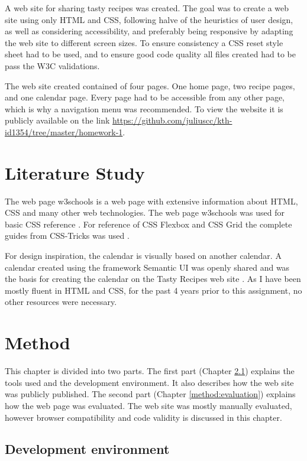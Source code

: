 \documentclass[a4paper]{scrartcl}
\begin{document}
A web site for sharing tasty recipes was created. The goal was to create a web site using only HTML and CSS, following halve of the heuristics of user design, as well as considering accessibility, and preferably being responsive by adapting the web site to different screen sizes. To ensure consistency a CSS reset style sheet had to be used, and to ensure good code quality all files created had to be pass the W3C validations.

The web site created contained of four pages. One home page, two recipe pages, and one calendar page. Every page had to be accessible from any other page, which is why a navigation menu was recommended. To view the website it is publicly available on the link \href{https://github.com/juliuscc/kth-id1354/tree/master/homework-1}{https://github.com/juliuscc/kth-id1354/tree/master/homework-1}.

\section{Literature Study}

The web page w3schools is a web page with extensive information about HTML, CSS and many other web technologies. The web page w3schools was used for basic CSS reference \cite{RefsnesData}. For reference of CSS Flexbox and CSS Grid the complete guides from CSS-Tricks was used \cite{Coyier,Coyiera}. 

For design inspiration, the calendar is visually based on another calendar. A calendar created using the framework Semantic UI was openly shared and was the basis for creating the calendar on the Tasty Recipes web site \cite{Nijin39} . As I have been mostly fluent in HTML and CSS, for the past 4 years prior to this assignment, no other resources were necessary.

\section{Method}
This chapter is divided into two parts. The first part (Chapter \ref{method:development}) explains the tools used and the development environment. It also describes how the web site was publicly published. The second part (Chapter \ref{method:evaluation}) explains how the web page was evaluated. The web site was mostly manually evaluated, however browser compatibility and code validity is discussed in this chapter.

\subsection{Development environment}
\label{method:development}
\end{document}
